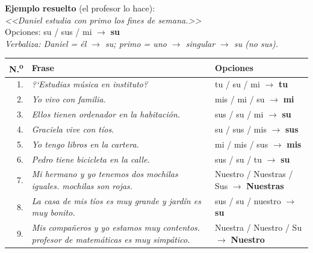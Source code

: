 \documentclass[a4paper,10pt]{article}
\renewcommand{\arraystretch}{1.3}
\newcommand{\pos}[1]{\textbf{\textcolor{purpura}{#1}}}
\begin{document}
\vspace{0.4cm}

\textbf{Ejemplo resuelto} (el profesor lo hace):\\
\textit{<<Daniel estudia con \underline{\hspace{1.5cm}} primo los fines de semana.>>}\\
Opciones: su / sus / mi $\rightarrow$ \pos{su}\\
\textit{Verbaliza: Daniel = \'el $\rightarrow$ su; primo = uno $\rightarrow$ singular $\rightarrow$ su (no sus).}

\vspace{0.4cm}

\renewcommand{\arraystretch}{1.6}
\begin{tabular}{r p{8.5cm} p{4cm}}
\textbf{N.\textsuperscript{o}} & \textbf{Frase} & \textbf{Opciones} \\
\midrule
1. & \textit{?`Estudias m\'usica en \underline{\hspace{1.5cm}} instituto?} & tu / su / mi $\rightarrow$ \textbf{\pos{tu}} \\[0.1cm]
2. & \textit{Yo vivo con \underline{\hspace{1.5cm}} familia.} & mis / mi / su $\rightarrow$ \textbf{\pos{mi}} \\[0.1cm]
3. & \textit{Ellos tienen \underline{\hspace{1.5cm}} ordenador en la habitaci\'on.} & sus / su / mi $\rightarrow$ \textbf{\pos{su}} \\[0.1cm]
4. & \textit{Graciela vive con \underline{\hspace{1.5cm}} t\'ios.} & su / sus / mis $\rightarrow$ \textbf{\pos{sus}} \\[0.1cm]
5. & \textit{Yo tengo \underline{\hspace{1.5cm}} libros en la cartera.} & mi / mis / sus $\rightarrow$ \textbf{\pos{mis}} \\[0.1cm]
6. & \textit{Pedro tiene \underline{\hspace{1.5cm}} bicicleta en la calle.} & sus / su / tu $\rightarrow$ \textbf{\pos{su}} \\[0.1cm]
7. & \textit{Mi hermano y yo tenemos dos mochilas iguales. \underline{\hspace{1.5cm}} mochilas son rojas.} & Nuestro / Nuestras / Sus $\rightarrow$ \textbf{\pos{Nuestras}} \\[0.1cm]
8. & \textit{La casa de mis t\'ios es muy grande y \underline{\hspace{1.5cm}} jard\'in es muy bonito.} & sus / su / nuestro $\rightarrow$ \textbf{\pos{su}} \\[0.1cm]
9. & \textit{Mis compa\~{n}eros y yo estamos muy contentos. \underline{\hspace{1.5cm}} profesor de matem\'aticas es muy simp\'atico.} & Nuestra / Nuestro / Su $\rightarrow$ \textbf{\pos{Nuestro}} \\
\end{tabular}
\end{document}
